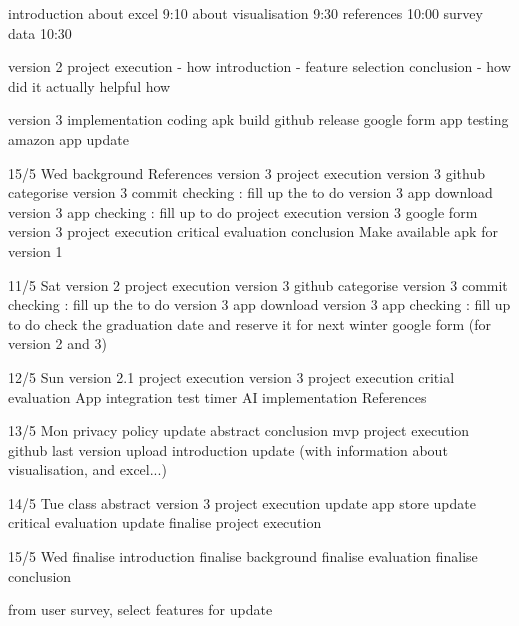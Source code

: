 introduction
    about excel 9:10
    about visualisation 9:30
    references 10:00
    survey data 10:30

version 2 project execution - how
    introduction - feature selection
    conclusion - how did it actually helpful
    how

version 3 implementation
    coding 
    apk build
    github release
    google form
    app testing
    amazon app update



15/5 Wed
background 
References
version 3 project execution
version 3 github categorise 
version 3 commit checking : fill up the to do
version 3 app download 
version 3 app checking : fill up to do
project execution version 3
google form version 3
project execution
critical evaluation
conclusion
Make available apk for version 1


11/5 Sat
version 2 project execution
version 3 github categorise 
version 3 commit checking : fill up the to do
version 3 app download 
version 3 app checking : fill up to do
check the graduation date and reserve it for next winter
google form (for version 2 and 3)


12/5 Sun
version 2.1 project execution
version 3 project execution
critial evaluation
App integration test
timer
AI implementation
References


13/5 Mon
privacy policy update
abstract
conclusion
mvp project execution
github last version upload
introduction update (with information about visualisation, and excel...)


14/5 Tue
class abstract
version 3 project execution update
app store update
critical evaluation update
finalise project execution

15/5 Wed
finalise introduction
finalise background
finalise evaluation
finalise conclusion



from user survey, select features for update
